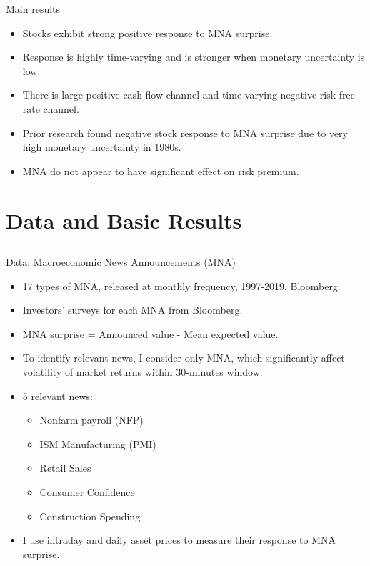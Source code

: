 \documentclass{beamer}
\begin{document}
\begin{frame}{Main results}
\begin{itemize}
    \item {Stocks exhibit strong positive response to MNA surprise.}    
    \item {Response is highly time-varying and is stronger when monetary uncertainty is low.}    
    \item {There is large positive cash flow channel and time-varying negative risk-free rate channel.}
    \item {Prior research found negative stock response to MNA surprise due to very high monetary uncertainty in 1980s.}
    \item {MNA do not appear to have significant effect on risk premium.}
    \begin{itemize}
    \end{itemize}
\end{itemize}
\end{frame}

\section{Data and Basic Results}
\subsection{}



\begin{frame}{Data: Macroeconomic News Announcements (MNA)}
\begin{itemize}
    \item {17 types of MNA, released at monthly frequency, 1997-2019, Bloomberg.}
    \item {Investors' surveys for each MNA from Bloomberg.}
    \item {MNA surprise = Announced value - Mean expected value.}
    \item {To identify relevant news, I consider only MNA, which significantly affect volatility of market returns within 30-minutes window.}
    \item {5 relevant news:}
    \begin{itemize}
    \footnotesize
        \item {Nonfarm payroll (NFP)}
        \item {ISM Manufacturing (PMI)}
        \item {Retail Sales}
        \item {Consumer Confidence}
        \item {Construction Spending}
    \end{itemize}
    \item {I use intraday and daily asset prices to measure their response to MNA surprise.}
\end{itemize}
\end{frame}
\end{document}
